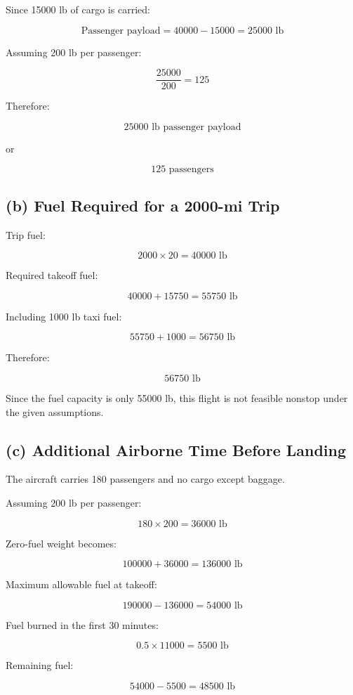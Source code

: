 \documentclass{KPS_assignment}
\begin{document}
Since 15000 lb of cargo is carried:

\[
\text{Passenger payload}
=
40000 - 15000
=
25000 \text{ lb}
\]

Assuming 200 lb per passenger:

\[
\frac{25000}{200}=125
\]

Therefore:

\[
\boxed{25000 \text{ lb passenger payload}}
\]

or

\[
\boxed{125 \text{ passengers}}
\]

\subsection*{(b) Fuel Required for a 2000-mi Trip}

Trip fuel:

\[
2000 \times 20 = 40000 \text{ lb}
\]

Required takeoff fuel:

\[
40000 + 15750 = 55750 \text{ lb}
\]

Including 1000 lb taxi fuel:

\[
55750 + 1000 = 56750 \text{ lb}
\]

Therefore:

\[
\boxed{56750 \text{ lb}}
\]

Since the fuel capacity is only 55000 lb, this flight is not feasible nonstop under the given assumptions.

\subsection*{(c) Additional Airborne Time Before Landing}

The aircraft carries 180 passengers and no cargo except baggage.

Assuming 200 lb per passenger:

\[
180 \times 200 = 36000 \text{ lb}
\]

Zero-fuel weight becomes:

\[
100000 + 36000 = 136000 \text{ lb}
\]

Maximum allowable fuel at takeoff:

\[
190000 - 136000 = 54000 \text{ lb}
\]

Fuel burned in the first 30 minutes:

\[
0.5 \times 11000 = 5500 \text{ lb}
\]

Remaining fuel:

\[
54000 - 5500 = 48500 \text{ lb}
\]
\end{document}
